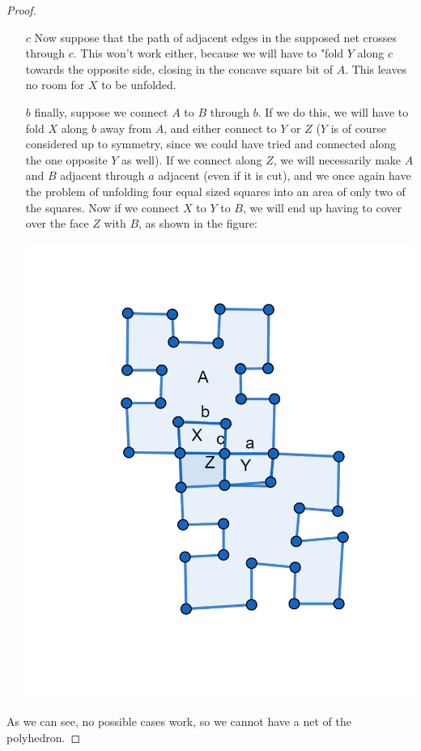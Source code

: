 \documentclass[12pt]{article}
\theoremstyle{definition}
\begin{document}
\begin{proof}
\begin{itemize}
\item[$c$] Now suppose that the path of adjacent edges in the supposed net crosses through $c$. This won't work either, because we will have to "fold $Y$ along $c$ towards the opposite side, closing in the concave square bit of $A$. This leaves no room for $X$ to be unfolded.

\item[$b$] finally, suppose we connect $A$ to $B$ through $b$. If we do this, we will have to fold $X$ along $b$ away from $A$, and either connect to $Y$ or $Z$ ($Y$ is of course considered up to symmetry, since we could have tried and connected along the one opposite $Y$ as well). If we connect along $Z$, we will necessarily make $A$ and $B$ adjacent through $a$ adjacent (even if it is cut), and we once again have the problem of unfolding four equal sized squares into an area of only two of the squares. Now if we connect $X$ to $Y$ to $B$, we will end up having to cover over the face $Z$ with $B$, as shown in the figure:

\includegraphics[scale=1]{unfold_along_Z.png} 

\end{itemize}

As we can see, no possible cases work, so we cannot have a net of the polyhedron. 
\end{proof}
\end{document}
